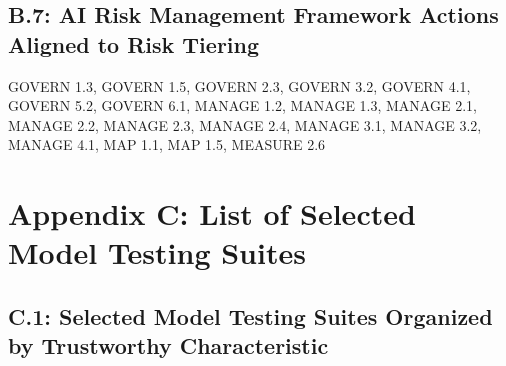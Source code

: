 \documentclass[fleqn]{article}
\begin{document}
\subsection*{B.7: AI Risk Management Framework Actions Aligned to Risk Tiering}\label{appndxb7}

GOVERN 1.3, GOVERN 1.5, GOVERN 2.3, GOVERN 3.2, GOVERN 4.1, GOVERN 5.2, GOVERN 6.1, MANAGE 1.2, MANAGE 1.3, MANAGE 2.1, MANAGE 2.2, MANAGE 2.3, 
MANAGE 2.4, MANAGE 3.1, MANAGE 3.2, MANAGE 4.1, MAP 1.1, MAP 1.5, MEASURE 2.6

\pagebreak

\section*{Appendix C: List of Selected Model Testing Suites}\label{sec:appndxc}\cite{aiverify_evals}


\subsection*{C.1: Selected Model Testing Suites Organized by Trustworthy Characteristic}\label{appndxc1}
\end{document}
